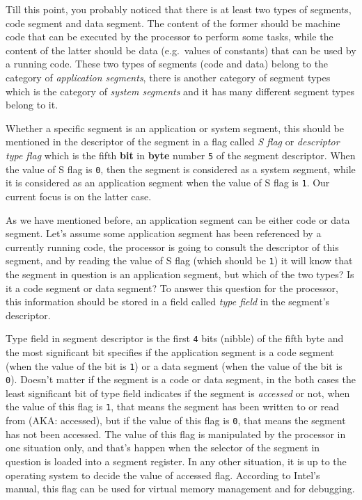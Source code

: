 Till this point, you probably noticed that there is at least two types
of segments, code segment and data segment. The content of the former
should be machine code that can be executed by the processor to perform
some tasks, while the content of the latter should be data (e.g.~values
of constants) that can be used by a running code. These two types of
segments (code and data) belong to the category of \emph{application
segments}, there is another category of segment types which is the
category of \emph{system segments} and it has many different segment
types belong to it.

Whether a specific segment is an application or system segment, this
should be mentioned in the descriptor of the segment in a flag called
\emph{S flag} or \emph{descriptor type flag} which is the fifth
\textbf{bit} in \textbf{byte} number \lstinline!5! of the segment
descriptor. When the value of S flag is \lstinline!0!, then the segment
is considered as a system segment, while it is considered as an
application segment when the value of S flag is \lstinline!1!. Our
current focus is on the latter case.

As we have mentioned before, an application segment can be either code
or data segment. Let's assume some application segment has been
referenced by a currently running code, the processor is going to
consult the descriptor of this segment, and by reading the value of S
flag (which should be \lstinline!1!) it will know that the segment in
question is an application segment, but which of the two types? Is it a
code segment or data segment? To answer this question for the processor,
this information should be stored in a field called \emph{type field} in
the segment's descriptor.

Type field in segment descriptor is the first \lstinline!4! bits
(nibble) of the fifth byte and the most significant bit specifies if the
application segment is a code segment (when the value of the bit is
\lstinline!1!) or a data segment (when the value of the bit is
\lstinline!0!). Doesn't matter if the segment is a code or data segment,
in the both cases the least significant bit of type field indicates if
the segment is \emph{accessed} or not, when the value of this flag is
\lstinline!1!, that means the segment has been written to or read from
(AKA: accessed), but if the value of this flag is \lstinline!0!, that
means the segment has not been accessed. The value of this flag is
manipulated by the processor in one situation only, and that's happen
when the selector of the segment in question is loaded into a segment
register. In any other situation, it is up to the operating system to
decide the value of accessed flag. According to Intel's manual, this
flag can be used for virtual memory management and for debugging.

